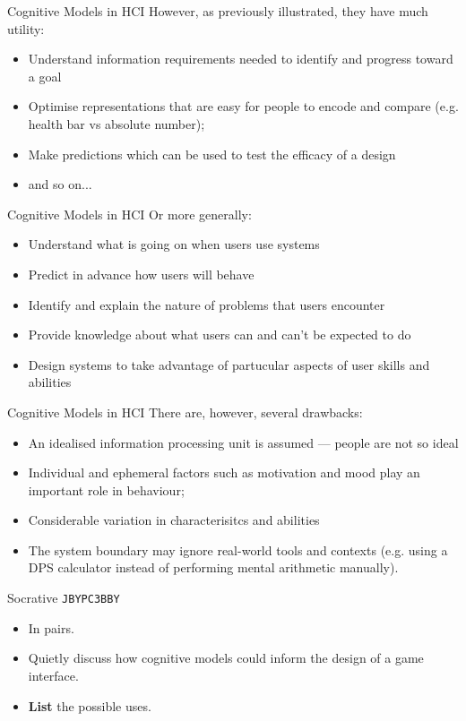 \begin{frame}{Cognitive Models in HCI}
	However, as previously illustrated, they have much utility:
	
	\vspace{2ex}

	\begin{itemize}
		\item Understand information requirements needed to identify and progress toward a goal
		\item Optimise representations that are easy for people to encode and compare (e.g. health bar vs absolute number);
		\item Make predictions which can be used to test the efficacy of a design
		\item and so on...
	\end{itemize}
\end{frame}

\begin{frame}{Cognitive Models in HCI}
	Or more generally:
	
	\vspace{2ex}

	\begin{itemize}
		\item Understand what is going on when users use systems
		\item Predict in advance how users will behave
		\item Identify and explain the nature of problems that users encounter
		\item Provide knowledge about what users can and can't be expected to do
		\item Design systems to take advantage of partucular aspects of user skills and abilities
	\end{itemize}
\end{frame}

\begin{frame}{Cognitive Models in HCI}
	There are, however, several drawbacks:
	
	\vspace{2ex}

	\begin{itemize}
		\item An idealised information processing unit is assumed --- people are not so ideal
		\item Individual and ephemeral factors such as motivation and mood play an important role in behaviour;
		\item Considerable variation in characterisitcs and abilities
		\item The system boundary may ignore real-world tools and contexts (e.g. using a DPS calculator instead of performing mental arithmetic manually).
	\end{itemize}
\end{frame}

\begin{frame}[fragile]{Socrative \texttt{JBYPC3BBY}}
	\begin{itemize}
		\item In pairs.
		\item Quietly discuss how cognitive models could inform the design of a game interface.
		\item \textbf{List} the possible uses.
	\end{itemize}
\end{frame}
